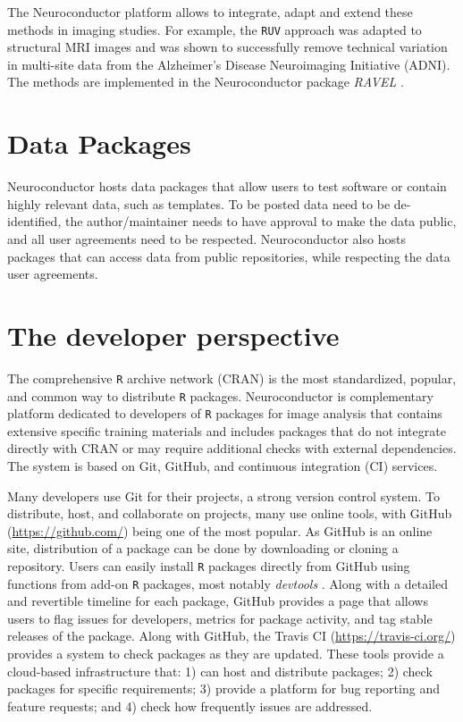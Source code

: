 \documentclass[]{elsarticle} %
\newcommand{\pkg}[1]{\emph{#1}}
\newcommand{\rlang}{\texttt{R}}
\begin{document}
The Neuroconductor platform allows to integrate, adapt and extend these methods in imaging studies. For example, the \texttt{RUV} approach was adapted to structural MRI images and was shown to successfully remove technical variation in multi-site data from the Alzheimer's Disease Neuroimaging Initiative (ADNI). The methods are implemented in the Neuroconductor package \pkg{RAVEL} \citep{ravel}. 

\section{Data Packages}\label{data-packages}
Neuroconductor hosts data packages that allow users to test
software or contain highly relevant data, such as templates. To be posted data need to be de-identified, the author/maintainer needs to have approval to make the data public, and all user agreements need to be respected. Neuroconductor also hosts packages that can access data from public repositories, while respecting the data user agreements.

\section{The developer perspective}\label{section:dev_perspective}

The comprehensive {\rlang} archive network (CRAN) is the most standardized, popular, and common way to distribute {\rlang} packages. Neuroconductor is complementary platform dedicated to developers of {\rlang} packages for image analysis that contains extensive specific training materials and includes packages that do not integrate directly with CRAN or may require additional checks with external dependencies.  The system is based on Git, GitHub, and continuous integration (CI) services.

Many developers use Git for their projects, a strong version control system.  To distribute, host, and collaborate on  projects, many use online tools, with GitHub (\url{https://github.com/}) being one of the most popular.  As GitHub is an online site, distribution of a package can be done by downloading or cloning a repository.  Users can easily install {\rlang} packages directly from GitHub using functions from add-on {\rlang} packages, most notably \pkg{devtools} \cite{devtools}.  Along with a detailed and revertible timeline for each package, GitHub provides a page that allows users to flag issues for developers, metrics for package activity, and tag stable releases of the package.  Along with GitHub, the Travis CI (\url{https://travis-ci.org/}) provides a system to check packages as they are updated.  These tools provide a cloud-based infrastructure that: 1) can host and distribute packages; 2) check packages for specific requirements; 3) provide a platform for bug reporting and feature requests; and 4) check how frequently issues are addressed.
\end{document}
